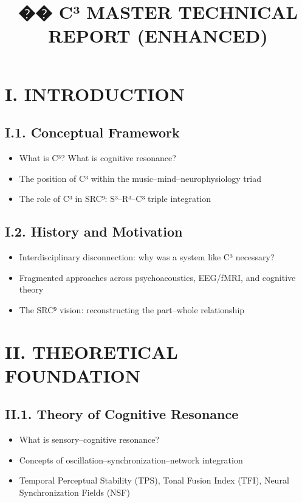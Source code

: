 \documentclass[10pt]{article}
\title{\textbf{�� C³ MASTER TECHNICAL REPORT (ENHANCED)}}
\date{}
\begin{document}
\maketitle

\section*{I. INTRODUCTION}

\subsection*{I.1. Conceptual Framework}

\begin{itemize}
    \item What is C³? What is cognitive resonance?
    \item The position of C³ within the music–mind–neurophysiology triad
    \item The role of C³ in SRC⁹: S³–R³–C³ triple integration
\end{itemize}

\subsection*{I.2. History and Motivation}

\begin{itemize}
    \item Interdisciplinary disconnection: why was a system like C³ necessary?
    \item Fragmented approaches across psychoacoustics, EEG/fMRI, and cognitive theory
    \item The SRC⁹ vision: reconstructing the part–whole relationship
\end{itemize}

\section*{II. THEORETICAL FOUNDATION}

\subsection*{II.1. Theory of Cognitive Resonance}

\begin{itemize}
    \item What is sensory–cognitive resonance?
    \item Concepts of oscillation–synchronization–network integration
    \item Temporal Perceptual Stability (TPS), Tonal Fusion Index (TFI), Neural Synchronization Fields (NSF)
\end{itemize}
\end{document}

